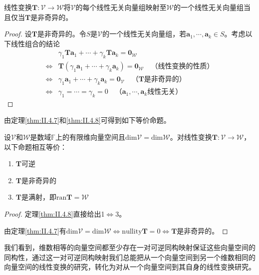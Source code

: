 \documentclass[main.tex]{subfiles}
\begin{document}
\begin{theorem}\label{thm:II.4.10}
线性变换$\mathbf{T}:\mathcal{V}\rightarrow\mathcal{W}$将$\mathcal{V}$的每个线性无关向量组映射至$\mathcal{W}$的一个线性无关向量组当且仅当$\mathbf{T}$是非奇异的。
\end{theorem}
\begin{proof}
设$\mathbf{T}$是非奇异的。令$S$是$\mathcal{V}$的一个线性无关向量组，若$\mathbf{a}_1,\cdots,\mathbf{a}_k\in S$。考虑以下线性组合的结论
\begin{align*}
&\gamma_1\mathbf{Ta}_1+\cdots+\gamma_k\mathbf{Ta}_k=\mathbf{0}_\mathcal{W}\\
\Leftrightarrow&\mathbf{T}\left(\gamma_1\mathbf{a}_1+\cdots+\gamma_k\mathbf{a}_k\right)=\mathbf{0}_\mathcal{W}\quad\text{（线性变换的性质）}\\
\Leftrightarrow&\gamma_1\mathbf{a}_1+\cdots+\gamma_k\mathbf{a}_k=\mathbf{0}_\mathcal{V}\quad\text{（$\mathbf{T}$是非奇异的）}\\
\Leftrightarrow &\gamma_1=\cdots=\gamma_k=0\quad\text{（$\mathbf{a}_1,\cdots,\mathbf{a}_k$线性无关）}
\end{align*}
\end{proof}

由定理\ref{thm:II.4.7}和\ref{thm:II.4.8}可得到如下等价命题。

\begin{theorem}\label{thm:II.4.11}
设$\mathcal{V}$和$\mathcal{W}$是数域$\mathbb{F}$上的有限维向量空间且$\mathrm{dim}\mathcal{V}=\mathrm{dim}\mathcal{W}$。对线性变换$\mathbf{T}:\mathcal{V}\rightarrow\mathcal{W}$，以下命题相互等价：
\begin{enumerate}
    \item $\mathbf{T}$可逆
    \item $\mathbf{T}$是非奇异的
    \item $\mathbf{T}$是满射，即$\mathrm{ran}\mathbf{T}=\mathcal{W}$
\end{enumerate}
\end{theorem}
\begin{proof}
定理\ref{thm:II.4.8}直接给出1$\Leftrightarrow$3。

由定理\ref{thm:II.4.7}有$\mathrm{dim}\mathcal{V}=\mathrm{dim}\mathcal{W}\Leftrightarrow\mathrm{nullity}\mathbf{T}=0\Leftrightarrow\mathbf{T}$是非奇异的。
\end{proof}

我们看到，维数相等的向量空间都至少存在一对可逆同构映射保证这些向量空间的同构性，通过这一对可逆同构映射我们总能把从一个向量空间到另一个维数相同的向量空间的线性变换的研究，转化为对从一个向量空间到其自身的线性变换研究。
\end{document}
